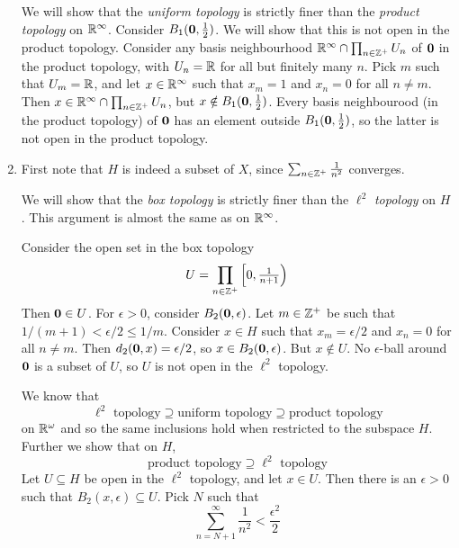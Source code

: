 \begin{enumerate}
We will show that the \emph{uniform topology} is strictly finer than the \emph{product topology} on $\mathbb R^\infty$. Consider $B_1(\mathbf 0, \frac12)$. We will show that this is not open in the product topology. Consider any basis neighbourhood $ \mathbb R^\infty \cap \prod_{n \in \mathbb Z^+} U_n$ of $\mathbf 0$ in the product topology, with $U_n = \mathbb R$ for all but finitely many $n$. Pick $m$ such that $U_m = \mathbb R$, and let $x \in \mathbb R^\infty$ such that $x_m = 1$ and $x_n = 0$ for all $n \neq m$. Then $x \in \mathbb R^\infty \cap \prod_{n \in \mathbb Z^+} U_n$, but $x \notin B_1(\mathbf 0, \frac12)$. Every basis neighbourood (in the product topology) of $\mathbf 0$ has an element outside $B_1(\mathbf 0, \frac12)$, so the latter is not open in the product topology.

\item First note that $H$ is indeed a subset of $X$, since $\sum_{n \in \mathbb Z^+} \frac{1}{n^2}$ converges.

We will show that the \emph{box topology} is strictly finer than the $\ell^2$ \emph{topology} on $H$. This argument is almost the same as on $\mathbb R^\infty$.


Consider the open set in the box topology
\[U = \prod_{n \in \mathbb Z^+} \left[0, \tfrac{1}{n+1}\right)\]
Then $\mathbf 0 \in U$. For $\epsilon > 0$, consider $B_2(\mathbf 0, \epsilon)$. Let $m \in \mathbb Z^+$ be such that $1/(m+1) < \epsilon/2 \leq 1/m$. Consider $x \in H$ such that $x_m = \epsilon/2$ and $x_n = 0$ for all $n \neq m$. Then $d_2(\mathbf 0, x) = \epsilon/2$, so $x \in B_2(\mathbf 0, \epsilon)$. But $x \notin U$. No $\epsilon$-ball around $\mathbf 0$ is a subset of $U$, so $U$ is not open in the $\ell^2$ topology.

We know that
\[\ell^2 \textrm { topology} \supseteq \textrm{uniform topology} \supseteq \textrm{product topology}\]
on $\mathbb R^\omega$ and so the same inclusions hold when restricted to the subspace $H$. Further we show that on $H$,
\[\textrm{product topology} \supseteq \ell^2 \textrm { topology}\]
Let $U \subseteq H$ be open in the $\ell^2$ topology, and let $x \in U$. Then there is an $\epsilon > 0$ such that $B_2(x, \epsilon) \subseteq U$. Pick $N$ such that
\[\sum_{n=N+1}^\infty \frac{1}{n^2} < \frac{\epsilon^2}{2}\]


\end{enumerate}
